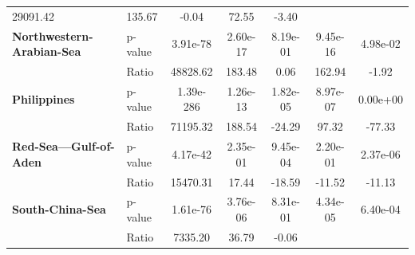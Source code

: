 \begin{table}[H]
{\begin{tabular}{llccccc}
            29091.42                                            & 135.67   &
            -0.04
                                                                & 72.55    &
            -3.40
            \\
            \textbf{Northwestern-Arabian-Sea}                   & p-value  &
            3.91e-78                                            & 2.60e-17 &
            8.19e-01                                            & 9.45e-16 &
            4.98e-02
            \\
            \textbf{}                                           & Ratio    &
            48828.62                                            & 183.48   &
            0.06
                                                                & 162.94   &
            -1.92
            \\
            \textbf{Philippines}                                & p-value  &
            1.39e-286                                           & 1.26e-13 &
            1.82e-05                                            & 8.97e-07 &
            0.00e+00
            \\
            \textbf{}                                           & Ratio    &
            71195.32                                            & 188.54   &
            -24.29
                                                                & 97.32    &
            -77.33
            \\
            \textbf{Red-Sea---Gulf-of-Aden}                     & p-value  &
            4.17e-42                                            & 2.35e-01 &
            9.45e-04                                            & 2.20e-01 &
            2.37e-06
            \\
            \textbf{}                                           & Ratio    &
            15470.31                                            & 17.44    &
            -18.59
                                                                & -11.52   &
            -11.13
            \\
            \textbf{South-China-Sea}                            & p-value  &
            1.61e-76                                            & 3.76e-06 &
            8.31e-01                                            & 4.34e-05 &
            6.40e-04
            \\
            \textbf{}                                           & Ratio    &
            7335.20                                             & 36.79    &
            -0.06

\end{tabular}}
\end{table}

